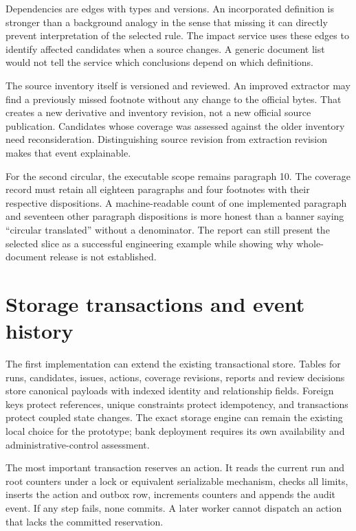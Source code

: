
Dependencies are edges with types and versions. An incorporated definition is
stronger than a background analogy in the sense that missing it can directly
prevent interpretation of the selected rule. The impact service uses these edges
to identify affected candidates when a source changes. A generic document list
would not tell the service which conclusions depend on which definitions.

The source inventory itself is versioned and reviewed. An improved extractor may
find a previously missed footnote without any change to the official bytes. That
creates a new derivative and inventory revision, not a new official source
publication. Candidates whose coverage was assessed against the older inventory
need reconsideration. Distinguishing source revision from extraction revision
makes that event explainable.

For the second circular, the executable scope remains paragraph 10. The coverage
record must retain all eighteen paragraphs and four footnotes with their
respective dispositions. A machine-readable count of one implemented paragraph
and seventeen other paragraph dispositions is more honest than a banner saying
``circular translated'' without a denominator. The report can still present the
selected slice as a successful engineering example while showing why whole-
document release is not established.

\section{Storage transactions and event history}
\label{merge:M08:06}


The first implementation can extend the existing transactional store. Tables for
runs, candidates, issues, actions, coverage revisions, reports and review decisions
store canonical payloads with indexed identity and relationship fields. Foreign
keys protect references, unique constraints protect idempotency, and transactions
protect coupled state changes. The exact storage engine can remain the existing
local choice for the prototype; bank deployment requires its own availability and
administrative-control assessment.

The most important transaction reserves an action. It reads the current run and
root counters under a lock or equivalent serializable mechanism, checks all
limits, inserts the action and outbox row, increments counters and appends the
audit event. If any step fails, none commits. A later worker cannot dispatch an
action that lacks the committed reservation.

